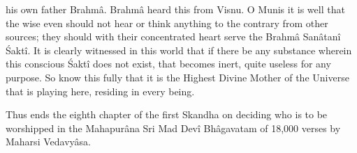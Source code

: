 his own father Brahm\^a. Brahm\^a heard this from Visnu. O Munis it is well that the wise even should not hear or think anything to the contrary from other sources; they should with their concentrated heart serve the Brahm\^a San\^atan\^i \'Sakt\^i. It is clearly witnessed in this world that if there be any substance wherein this conscious \'Sakt\^i does not exist, that becomes inert, quite useless for any purpose. So know this fully that it is the Highest Divine Mother of the Universe that is playing here, residing in every being.

Thus ends the eighth chapter of the first Skandha on deciding who is to be worshipped in the Mahapur\^ana Sri Mad Dev\^i Bh\^agavatam of 18,000 verses by Maharsi Vedavy\^asa.